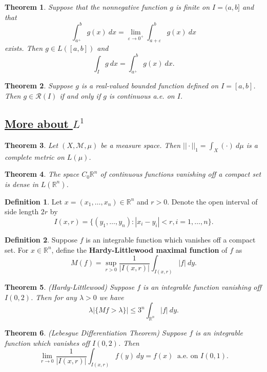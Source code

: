 \documentclass[11pt]{amsart}
\newtheorem*{theorem*}{Theorem}
\theoremstyle{definition}
\newtheorem*{definition*}{Definition}
\renewcommand\leq{\leqslant}
\renewcommand\:{\colon}
\newcommand{\calM}{\mathcal{M}}
\newcommand{\calR}{\mathcal{R}}
\newcommand{\R}{\mathds{R}}
\newcommand{\dmu}{\ d\mu}
\newcommand{\dx}{\ dx}
\newcommand{\dy}{\ dy}
\begin{document}
\begin{theorem*}
	Suppose that the nonnegative function $g$ is finite on $I = (a, b]$ and that 
		\[ \int_{a^+}^b g(x) \dx = \lim_{\varepsilon \to 0^+} \int_{a+\varepsilon}^b g(x) \dx \]
	 exists. Then $g \in L([a,b])$ and 
	 	\[ \int_I g \dx = \int_{a^+}^b g(x) \dx. \]
\end{theorem*}

\begin{theorem*}
	Suppose $g$ is a real-valued bounded function defined on $I = [a,b]$. Then $g \in \calR(I)$ if and only if $g$ is continuous a.e. on $I$.
\end{theorem*}
\vskip20pt



\subsection*{\underline{More about $L^1$}}

\begin{theorem*}
	Let $(X, \calM, \mu)$ be a measure space. Then $|| \cdot ||_1 = \int_X (\cdot) \dmu$ is a complete metric on $L(\mu)$.
\end{theorem*}

\begin{theorem*}
	The space $C_0\R^n$ of continuous functions vanishing off a compact set is dense in $L(\R^n)$. 
\end{theorem*}

\begin{definition*}
	Let $x = (x_1, \dots, x_n) \in \R^n$ and $r > 0$. Denote the open interval of side length $2r$ by \[ I(x, r) = \{(y_1, \dots, y_n) : |x_i - y_i| < r, i = 1,\dots,n\}. \]
\end{definition*}

\begin{definition*}
	Suppose $f$ is an integrable function which vanishes off a compact set. For $x \in \R^n$, define the \textbf{Hardy-Littlewood maximal function} of $f$ as
		\[ M(f) = \sup_{r > 0} \frac1{|I(x, r)|} \int_{I(x,r)} |f| \dy. \]
\end{definition*}

\begin{theorem*}
	\textnormal{(Hardy-Littlewood)} Suppose $f$ is an integrable function vanishing off $I(0,2)$. Then for any $\lambda > 0$ we have
		\[ \lambda|\{Mf > \lambda\}| \leq 3^n \int_{\R^n} |f| \dy. \]
\end{theorem*}

\begin{theorem*}
	\textnormal{(Lebesgue Differentiation Theorem)} Suppose $f$ is an integrable function which vanishes off $I(0,2)$. Then
		\[ \lim_{r \to 0} \frac1{|I(x,r)|} \int_{I(x,r)} f(y) \dy = f(x) \ \text{ a.e. on } I(0,1). \]
\end{theorem*}
\vskip20pt
\end{document}
